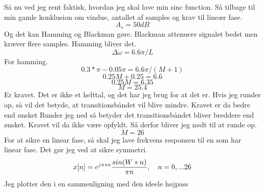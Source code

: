 \begin{Opgaver}
\begin{kapitel}
\begin{Opgave}
\begin{UnderOpgave}
                Så nu ved jeg rent faktisk, hvordan jeg skal lave min sinc function. 
                Så tilbage til min gamle konklusion om vindue, antallet af samples og krav til lineær fase.
                \[A_s = 50dB\]
                Og det kan Hamming og Blackman gøre. 
                Blackman attenuere signalet bedst men kræver flere samples.
                Hamming bliver det. 
                \[\Delta \omega = 6.6\pi / L \] 
                For hamming. 
                \[0.3 * \pi - 0.05 \pi = 6.6 \pi / (M + 1)\]
                \[0.25M + 0.25 = 6.6\]
                \[0.25M = 6.35 \]
                \[M = 25.4\]
                Er kravet. Det er ikke et helttal, og det har jeg brug for at det er. 
                Hvis jeg runder op, så vil det betyde, at transitionsbåndet vil blive mindre. Kravet er da bedre end ønsket
                Runder jeg ned så betyder det transitionsbåndet bliver breddere end ønsket.   Kravet vil da ikke være opfyldt.
                Så derfor bliver jeg nødt til at runde op. 
                \[M = 26\]
                For at sikre en linear fase, så skal jeg lave frekvens responsen til en som har linear fase.
                Det gør jeg ved at sikre symmetri. 
                \[x[n] = e^{j\pi*n}\frac{sin(W*n)}{\pi n}, \tab{0} n = 0, ... 26\]
                Jeg plotter den i en sammenligning med den ideele højpass





\end{UnderOpgave}
\end{Opgave}
\end{kapitel}
\end{Opgaver}
